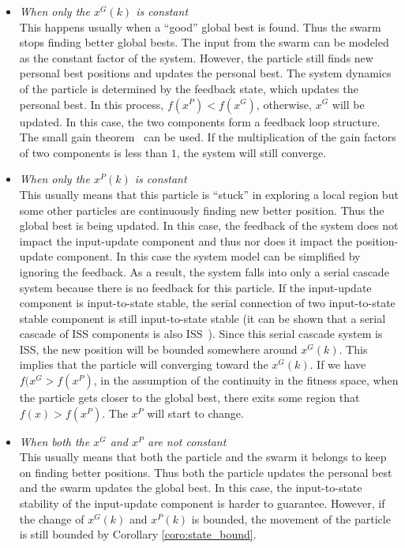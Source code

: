 \documentclass{sig-alternate}
\begin{document}
\begin{itemize}
\item \emph{When only the $ x^{G} (k) $ is constant} \\
This happens usually when a ``good'' global best is found.
Thus the swarm stops finding better global bests.
The input from the swarm can be modeled as the constant factor of the system. 
However, the particle still finds new personal best positions and updates the personal best.
The system dynamics of the particle is determined by the feedback state,
which updates the personal best.
In this process, $ f(x^{P}) < f(x^{G}) $, otherwise, $ x^{G} $ will be updated.
In this case, the two components form a feedback loop structure.
The small gain theorem~\cite{Jiang2001857} can be used.
If the multiplication of the gain factors of two components is less than $ 1 $, the system will still converge.
\item \emph{When only the $ x^{P} (k) $ is constant} \\
This usually means that this particle is ``stuck'' in exploring a local region but some other particles are continuously finding new better position. 
Thus the global best is being updated.
In this case, the feedback of the system does not impact the input-update component and thus nor does it impact the position-update component.
In this case the system model can be simplified by ignoring the feedback.
As a result, the system falls into only a serial cascade system because there is no feedback for this particle.
If the input-update component is input-to-state stable, the serial connection of two input-to-state stable component is still input-to-state stable (it can be shown that a serial cascade of ISS components is also ISS~\cite{khalil1996nonlinear}).
Since this serial cascade system is ISS, the new position will be bounded somewhere around $ x^{G} (k) $. This implies that the particle will converging toward the $ x^{G} (k) $.
If we have  $ f(x^{G} > f(x^{P}) $, in the assumption of the continuity in the fitness space, when the particle gets closer to the global best, there exits some region that $ f(x) > f(x^{P}) $.
The $ x^{P} $ will start to change.
\item \emph{When both the $ x^{G} $ and $ x^{P} $ are not constant} \\
This usually means that both the particle and the swarm it belongs to keep on finding better positions.
Thus both the particle updates the personal best and the swarm updates the global best.
In this case, the input-to-state stability of the input-update component is harder to guarantee.
However, if the change of $ x^{G}(k) $ and $ x^{P}(k) $ is bounded, the movement of the particle is still bounded by Corollary \ref{coro:state_bound}.
\end{itemize}
\end{document}
